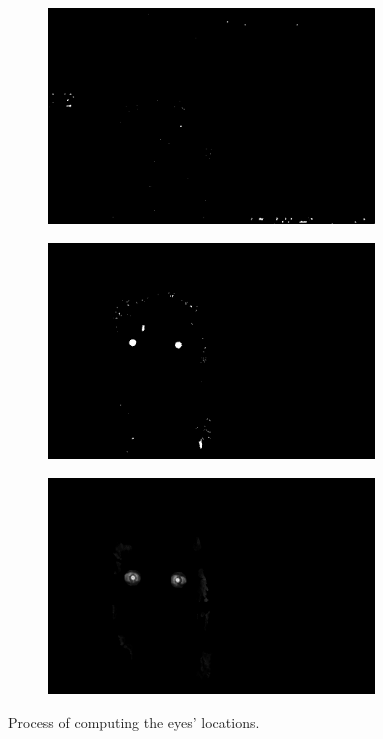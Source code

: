 \begin{figure}[H]
\begin{subfigure}{.33\textwidth}
  \centering
  \includegraphics[width=0.95\textwidth]{img/fd/OverSaturatedMask.png}
  \caption{}
\end{subfigure}%
\begin{subfigure}{.33\textwidth}
  \centering
  \includegraphics[width=0.95\textwidth]{img/fd/FilteredFaceMaskEyesReal.png}
  \caption{}
\end{subfigure}%
\begin{subfigure}{.33\textwidth}
  \centering
  \includegraphics[width=0.95\textwidth]{img/fd/EyeMap2.png}
  \caption{}
\end{subfigure}%

\caption{Process of computing the eyes' locations.}
\label{fig:eyeMap}
\end{figure}